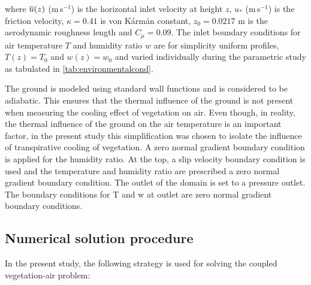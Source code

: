 where $\overline{u}(z)$ (m\,s$^{-1}$) is the horizontal inlet velocity at height $z$, $u_*$ (m\,s$^{-1}$) is the friction velocity, $\kappa=0.41$ is von K\'arm\'an constant, $z_0=\num{0.0217}$ m is the aerodynamic roughness length and $C_{\mu}=0.09$. The inlet boundary conditions for air temperature $T$ and humidity ratio $w$ are for simplicity uniform profiles, $T(z)=T_0$ and $w(z)=w_0$ and varied individually during the parametric study as tabulated in \cref{tab:environmentalcond}.

The ground is modeled using standard wall functions and is considered to be adiabatic. This ensures that the thermal influence of the ground is not present when measuring the cooling effect of vegetation on air. Even though, in reality, the thermal influence of the ground on the air temperature is an important factor, in the present study this simplification was chosen to isolate the influence of transpirative cooling of vegetation. A zero normal gradient boundary condition is applied for the humidity ratio. At the top, a slip velocity boundary condition is used and the temperature and humidity ratio are prescribed a zero normal gradient boundary condition. The outlet of the domain is set to a pressure outlet. The boundary conditions for T and w at outlet are zero normal gradient boundary conditions. 

\subsection{Numerical solution procedure}

In the present study, the following strategy is used for solving the coupled vegetation-air problem:

